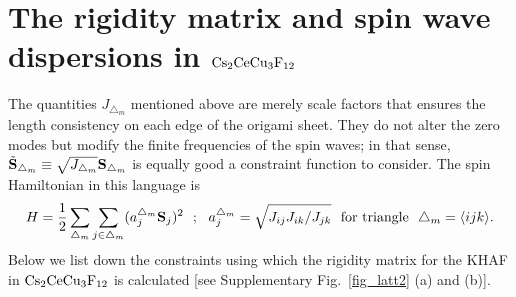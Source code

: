 \documentclass[a4paper,aps,prl,floatfix,showpacs,superscriptaddress,notitlepage]{revtex4-1}
\begin{document}

\section{The rigidity matrix and spin wave dispersions in ${\rm Cs}_2{\rm CeCu}_3{\rm F}_{12}$}\label{sectwo}

The quantities $J_{\triangle_m}$ mentioned above are merely scale factors that ensures the length consistency on each edge of the origami sheet. They do not alter the zero modes but modify the finite frequencies of the spin waves; in that sense, $\tilde{{\bf S}}_{\triangle_m}\equiv\sqrt{J_{\triangle_m}}{\bf S}_{\triangle_m}$ is equally good a constraint function to consider. The spin Hamiltonian in this language is 
\begin{equation}
 H = \frac{1}{2}\sum_{\triangle_m} \sum_{j\in\triangle_m} (a^{\triangle_m}_j{\bf S}_j)^2~~;~~ a^{\triangle_m}_j=\sqrt{J_{ij}J_{ik}/J_{jk}}~~ \text{for triangle}~~\triangle_m =\langle ijk\rangle. 
\end{equation}
Below we list down the constraints using which the rigidity matrix for the KHAF in ${\rm Cs}_2{\rm CeCu}_3{\rm F}_{12}$ is calculated [see Supplementary Fig.~\ref{fig_latt2} (a) and (b)].
\end{document}
